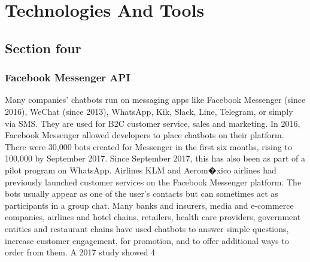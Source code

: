 \chapter{Technologies And Tools}
\label{chap:chap5}

\section{Section four}

  \subsection{Facebook Messenger API}
Many companies' chatbots run on messaging apps like Facebook Messenger (since 2016), WeChat (since 2013), WhatsApp, Kik, Slack, Line, Telegram, or simply via SMS. They are used for B2C customer service, sales and marketing. 
In 2016, Facebook Messenger allowed developers to place chatbots on their platform. There were 30,000 bots created for Messenger in the first six months, rising to 100,000 by September 2017.
Since September 2017, this has also been as part of a pilot program on WhatsApp. Airlines KLM and Aerom�xico  airlines had previously launched customer services on the Facebook Messenger platform.
The bots usually appear as one of the user's contacts but can sometimes act as participants in a group chat.
Many banks and insurers, media and e-commerce companies, airlines and hotel chains, retailers, health care providers, government entities and restaurant chains have used chatbots to answer simple questions, increase customer engagement, for promotion, and to offer additional ways to order from them. 
A 2017 study showed 4%

